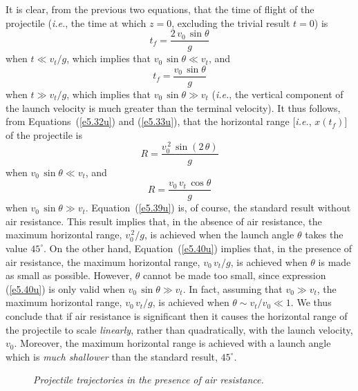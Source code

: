 It is clear, from the previous two equations, that the time
of flight of the projectile ({\em i.e.}, the time at which $z=0$, excluding the
trivial result $t=0$) is
\begin{equation}
t_f = \frac{2\,v_0\,\sin\theta}{g}
\end{equation}
when $t\ll v_t/g$, which implies that $v_0\,\sin\theta \ll v_t$,
and
\begin{equation}
t_f = \frac{v_0\,\sin\theta}{g}
\end{equation}
when  $t\gg v_t/g$, which implies that $v_0\,\sin\theta \gg v_t$ ({\em i.e.}, the vertical component of the
launch velocity is much greater than the terminal velocity).
It thus follows, from Equations~(\ref{e5.32u}) and (\ref{e5.33u}), that
the horizontal range [{\em i.e.}, $x(t_f)$] of the projectile
is 
\begin{equation}\label{e5.39u}
R = \frac{v_0^{\,2}\,\sin(2\,\theta)}{g}
\end{equation}
when $v_0\,\sin\theta \ll v_t$, and
\begin{equation}\label{e5.40u}
R= \frac{v_0\,v_t\,\cos\theta}{g}
\end{equation}
when $v_0\,\sin\theta \gg v_t$.
Equation~(\ref{e5.39u}) is, of course, the standard result without
air resistance. This result implies that, in the absence of air resistance, the maximum horizontal range, $v_0^{\,2}/g$,
is achieved when the launch angle $\theta$ takes the value $45^\circ$.
On the other hand, Equation~(\ref{e5.40u}) implies that, in the presence of
air resistance, the maximum horizontal
range, $v_0\,v_t/g$, is achieved when $\theta$ is made as small
as possible. However, $\theta$ cannot be made too small, since
expression (\ref{e5.40u}) is only valid when $v_0\,\sin\theta \gg v_t$.
In fact, assuming  that $v_0\gg v_t$,  the maximum horizontal
range, $v_0\,v_t/g$, is achieved when $\theta\sim v_t/v_0\ll 1$. We thus
conclude that if air resistance is significant then it causes the horizontal range of the
projectile to scale {\em linearly}, rather than quadratically, with the
launch velocity, $v_0$. Moreover, the maximum horizontal  range is achieved
with a launch angle which is {\em much shallower}\/ than the standard
result, $45^\circ$. 

\begin{figure}[h]
\epsfysize=3in
\centerline{}
\caption{\em Projectile trajectories in the presence of air resistance.}\label{fdrag}
\end{figure}

